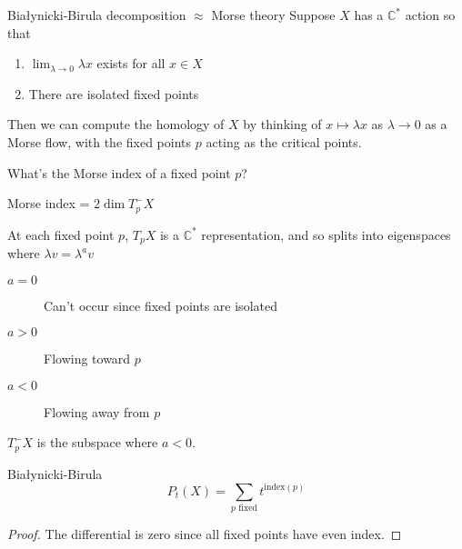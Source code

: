 \documentclass{beamer}
\newcommand{\C}{\mathbb{C}}
\begin{document}
\begin{frame}{Bia\l ynicki-Birula decomposition $\approx$ Morse theory}
Suppose $X$ has a $\C^*$ action so that

\begin{enumerate}
\item $\lim_{\lambda\to 0} \lambda x$ exists for all $x\in X$
\item There are isolated fixed points
\end{enumerate}

Then we can compute the homology of $X$ by thinking of $x\mapsto\lambda x$ as $\lambda\to 0$ as a Morse flow, with the fixed points $p$ acting as the critical points.  

\begin{block}{What's the Morse index of a fixed point $p$?}
\end{block}
\end{frame}

\begin{frame}{Morse index = $2\dim T^-_pX$}

At each fixed point $p$, $T_pX$ is a $\C^*$ representation, and so splits into eigenspaces where $\lambda v=\lambda^a v$

\begin{description}
\item[$a=0$] Can't occur since fixed points are isolated
\item[$a>0$]  Flowing toward $p$
\item [$a<0$] Flowing away from $p$ 
\end{description}
$T^-_pX$ is the subspace where $a<0$.

\begin{Theorem}{Bia\l ynicki-Birula}
$$P_t(X)=\sum_{p\textrm{ fixed}} t^{\textrm{index}(p)}$$
\end{Theorem}
\begin{proof}
The differential is zero since all fixed points have even index.
\end{proof}
\end{frame}
\end{document}
